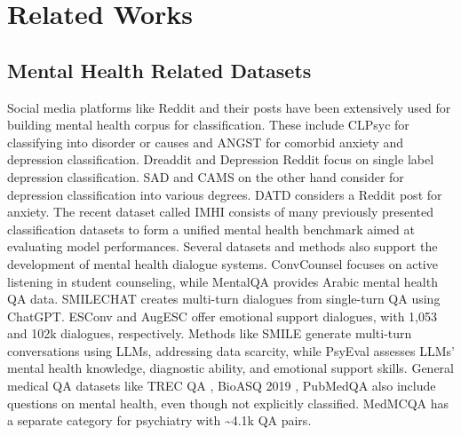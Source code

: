\section{Related Works}
\subsection{Mental Health Related Datasets}
Social media platforms like Reddit and their posts have been extensively used for building mental health corpus for classification. These include CLPsyc \cite{clpsyc} for classifying into disorder or causes and ANGST \cite{angst} for comorbid anxiety and depression classification. Dreaddit and Depression Reddit focus on single label depression classification. 
SAD \cite{sad-dataset} and CAMS \cite{cams-dataset} on the other hand consider for depression classification into various degrees. DATD considers a Reddit post for anxiety.
The recent dataset called IMHI \cite{mentallama} consists of many previously presented classification datasets to form a unified mental health benchmark aimed at evaluating model performances.
Several datasets and methods also support the development of mental health dialogue systems. ConvCounsel \cite{chen2024convcounselconversationaldatasetstudent} focuses on active listening in student counseling, while MentalQA \cite{alhuzali2024mentalqaannotatedarabiccorpus} provides Arabic mental health QA data. SMILECHAT \cite{qiu2024smilesingleturnmultiturninclusive}creates multi-turn dialogues from single-turn QA using ChatGPT. ESConv \cite{liu2021emotionalsupportdialogsystems} and AugESC \cite{zheng2023augescdialogueaugmentationlarge} offer emotional support dialogues, with 1,053 and 102k dialogues, respectively. Methods like SMILE generate multi-turn conversations using LLMs, addressing data scarcity, while PsyEval \cite{jin2024psyevalsuitementalhealth} assesses LLMs’ mental health knowledge, diagnostic ability, and emotional support skills. General medical QA datasets like TREC QA \cite{trecqa}, BioASQ 2019 \cite{bioasq}, PubMedQA \cite{pubmedqa} also include questions on mental health, even though not explicitly classified. MedMCQA \cite{medmcqa} has a separate category for psychiatry with \textasciitilde4.1k QA pairs. 


